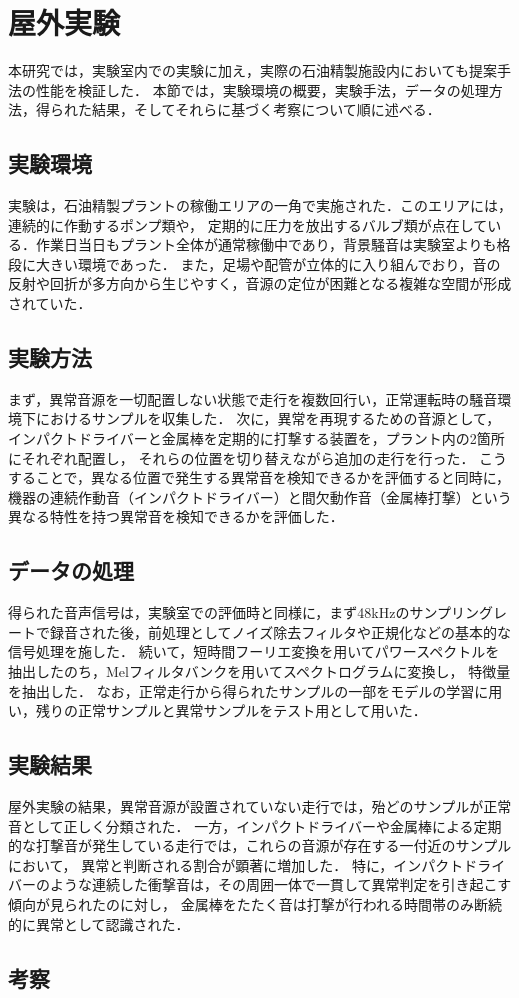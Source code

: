 \documentclass[../main]{subfiles}
\begin{document}
\section{屋外実験}
\label{sec:vexp_cone-index}
本研究では，実験室内での実験に加え，実際の石油精製施設内においても提案手法の性能を検証した．
本節では，実験環境の概要，実験手法，データの処理方法，得られた結果，そしてそれらに基づく考察について順に述べる．
\subsection{実験環境}
\label{subsec:vexp_ci_environment}
実験は，石油精製プラントの稼働エリアの一角で実施された．このエリアには，連続的に作動するポンプ類や，
定期的に圧力を放出するバルブ類が点在している．作業日当日もプラント全体が通常稼働中であり，背景騒音は実験室よりも格段に大きい環境であった．
また，足場や配管が立体的に入り組んでおり，音の反射や回折が多方向から生じやすく，音源の定位が困難となる複雑な空間が形成されていた．
\subsection{実験方法}
\label{subsec:vexp_ci_method}

まず，異常音源を一切配置しない状態で走行を複数回行い，正常運転時の騒音環境下におけるサンプルを収集した．
次に，異常を再現するための音源として，インパクトドライバーと金属棒を定期的に打撃する装置を，プラント内の2箇所にそれぞれ配置し，
それらの位置を切り替えながら追加の走行を行った．
こうすることで，異なる位置で発生する異常音を検知できるかを評価すると同時に，
機器の連続作動音（インパクトドライバー）と間欠動作音（金属棒打撃）という異なる特性を持つ異常音を検知できるかを評価した．
\subsection{データの処理}
\label{subsec:vexp_ci_processing}
得られた音声信号は，実験室での評価時と同様に，まず48kHzのサンプリングレートで録音された後，前処理としてノイズ除去フィルタや正規化などの基本的な信号処理を施した．
続いて，短時間フーリエ変換を用いてパワースペクトルを抽出したのち，Melフィルタバンクを用いてスペクトログラムに変換し，
特徴量を抽出した．
なお，正常走行から得られたサンプルの一部をモデルの学習に用い，残りの正常サンプルと異常サンプルをテスト用として用いた．

\subsection{実験結果}
\label{subsec:vexp_ci_result}
屋外実験の結果，異常音源が設置されていない走行では，殆どのサンプルが正常音として正しく分類された．
一方，インパクトドライバーや金属棒による定期的な打撃音が発生している走行では，これらの音源が存在する一付近のサンプルにおいて，
異常と判断される割合が顕著に増加した．
特に，インパクトドライバーのような連続した衝撃音は，その周囲一体で一貫して異常判定を引き起こす傾向が見られたのに対し，
金属棒をたたく音は打撃が行われる時間帯のみ断続的に異常として認識された．
\subsection{考察}
\end{document}
